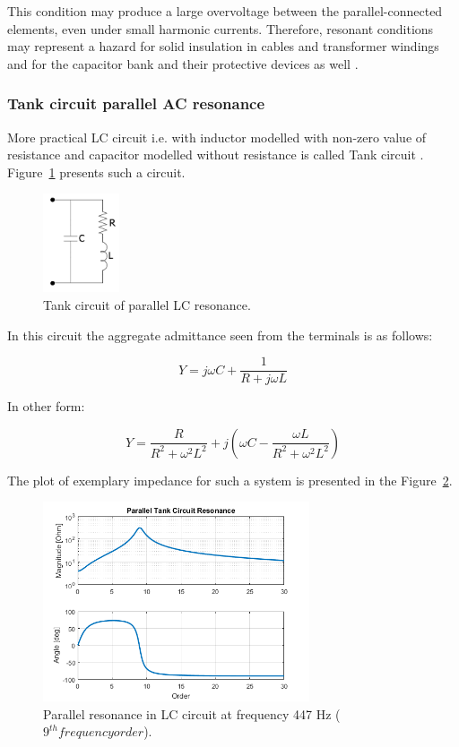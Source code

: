 \documentclass[12pt]{report} %
\begin{document}
This condition may produce a large overvoltage between the parallel-connected elements, even under small harmonic currents. Therefore, resonant conditions may represent a hazard for solid insulation in cables and transformer windings and for the capacitor bank and their protective devices as well \cite{rosa}. 

\subsubsection{Tank circuit parallel AC resonance}
More practical LC circuit i.e. with inductor modelled with non-zero value of resistance and capacitor modelled without resistance is called Tank circuit \cite{das}. Figure~\ref{fig:tank} presents such a circuit.

\begin{figure}[htb]
	\centering
		\includegraphics[width=0.2\textwidth]{img/theory/tank_circ.PNG}
	\caption{Tank circuit of parallel LC resonance.}
	\label{fig:tank}
\end{figure}
\FloatBarrier

In this circuit the aggregate admittance seen from the terminals is as follows:

\begin{equation}
	Y=j\omega C+\dfrac{1}{R+j\omega L}
\end{equation}

In other form:

\begin{equation}
	Y=\dfrac{R}{R^2+\omega^2L^2}+j\left(\omega C-\dfrac{\omega L}{R^2+\omega^2L^2}\right)
\end{equation}

The plot of exemplary impedance for such a system is presented in the Figure~\ref{fig:tankresonance}.

\begin{figure}[htb]
	\centering
		\includegraphics[width=0.7\textwidth]{img/theory/tank_parallel_resonance_f447.png}
	\caption{Parallel resonance in LC circuit at frequency 447 Hz ($9^{th} frequency order$).}
	\label{fig:tankresonance}
\end{figure}
\FloatBarrier
\end{document}
